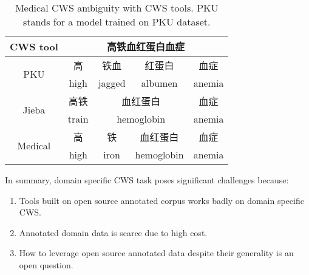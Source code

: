 \begin{table}[th]
\centering
\begin{adjustbox}{width=7.7cm}
\begin{tabular}{|c|c|c|c|c|}
\hline
{\bf CWS tool} & \multicolumn{4}{c|}{\bf 高铁血红蛋白血症} \\
\hline
\multirow{2}{*}{PKU} & 高 & 铁血 & 红蛋白 & 血症 \\ & high & jagged & albumen & anemia\\
\hline
\multirow{2}{*}{Jieba} & 高铁 & \multicolumn{2}{c|}{血红蛋白}  & 血症 \\ & train & \multicolumn{2}{c|}{hemoglobin} & anemia\\
\hline
\multirow{2}{*}{Medical} & 高 & 铁 & 血红蛋白  & 血症 \\ & high & iron & hemoglobin & anemia\\
\hline
\end{tabular}
\end{adjustbox}
\caption{Medical CWS ambiguity with CWS tools. PKU stands for a model trained on PKU dataset.}
\label{table:1}
\end{table}

In summary, domain specific CWS task poses significant challenges because:
\begin{enumerate}
\item Tools built on open source annotated corpus works badly on 
domain specific CWS.
\item Annotated domain data is scarce due to high cost.
\item How to leverage open source annotated data despite their generality is
an open question.
\end{enumerate}

